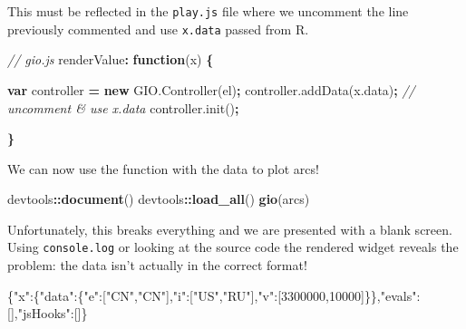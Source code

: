 \documentclass[
]{krantz}
\makeatletter
\newenvironment{Shaded}{\begin{snugshade}}{\end{snugshade}}
\newcommand{\AttributeTok}[1]{\textcolor[rgb]{0.61,0.61,0.61}{#1}}
\newcommand{\CommentTok}[1]{\textcolor[rgb]{0.37,0.37,0.37}{\textit{#1}}}
\newcommand{\DataTypeTok}[1]{\textcolor[rgb]{0.27,0.27,0.27}{#1}}
\newcommand{\DecValTok}[1]{\textcolor[rgb]{0.06,0.06,0.06}{#1}}
\newcommand{\FunctionTok}[1]{\textcolor[rgb]{0,0,0}{#1}}
\newcommand{\KeywordTok}[1]{\textcolor[rgb]{0.27,0.27,0.27}{\textbf{#1}}}
\newcommand{\NormalTok}[1]{#1}
\newcommand{\OperatorTok}[1]{\textcolor[rgb]{0.43,0.43,0.43}{\textbf{#1}}}
\newcommand{\OtherTok}[1]{\textcolor[rgb]{0.37,0.37,0.37}{#1}}
\newcommand{\StringTok}[1]{\textcolor[rgb]{0.5,0.5,0.5}{#1}}
\newcommand{\VariableTok}[1]{\textcolor[rgb]{0,0,0}{#1}}
\newenvironment{kframe}{%
\medskip{}
\setlength{\fboxsep}{.8em}
 \def\at@end@of@kframe{}%
 \ifinner\ifhmode%
  \def\at@end@of@kframe{\end{minipage}}%
  \begin{minipage}{\columnwidth}%
 \fi\fi%
 \def\FrameCommand##1{\hskip\@totalleftmargin \hskip-\fboxsep
 \colorbox{shadecolor}{##1}\hskip-\fboxsep
     \hskip-\linewidth \hskip-\@totalleftmargin \hskip\columnwidth}%
 \MakeFramed {\advance\hsize-\width
   \@totalleftmargin\z@ \linewidth\hsize
   \@setminipage}}%
 {\par\unskip\endMakeFramed%
 \at@end@of@kframe}
\renewenvironment{Shaded}{\begin{kframe}}{\end{kframe}}
\makeatother
\begin{document}
This must be reflected in the \texttt{play.js} file where we uncomment the line previously commented and use \texttt{x.data} passed from R.

\begin{Shaded}
\begin{Highlighting}[]
\CommentTok{// gio.js}
\NormalTok{renderValue}\OperatorTok{:} \KeywordTok{function}\NormalTok{(x) }\OperatorTok{\{}

  \KeywordTok{var}\NormalTok{ controller }\OperatorTok{=} \KeywordTok{new} \VariableTok{GIO}\NormalTok{.}\AttributeTok{Controller}\NormalTok{(el)}\OperatorTok{;}
  \VariableTok{controller}\NormalTok{.}\AttributeTok{addData}\NormalTok{(}\VariableTok{x}\NormalTok{.}\AttributeTok{data}\NormalTok{)}\OperatorTok{;} \CommentTok{// uncomment \& use x.data}
  \VariableTok{controller}\NormalTok{.}\AttributeTok{init}\NormalTok{()}\OperatorTok{;}

\OperatorTok{\}}
\end{Highlighting}
\end{Shaded}

We can now use the function with the data to plot arcs!

\begin{Shaded}
\begin{Highlighting}[]
\NormalTok{devtools}\OperatorTok{::}\KeywordTok{document}\NormalTok{()}
\NormalTok{devtools}\OperatorTok{::}\KeywordTok{load\_all}\NormalTok{()}
\KeywordTok{gio}\NormalTok{(arcs)}
\end{Highlighting}
\end{Shaded}

Unfortunately, this breaks everything and we are presented with a blank screen. Using \texttt{console.log} or looking at the source code the rendered widget reveals the problem: the data isn't actually in the correct format!

\begin{Shaded}
\begin{Highlighting}[]
\FunctionTok{\{}\DataTypeTok{"x"}\FunctionTok{:\{}\DataTypeTok{"data"}\FunctionTok{:\{}\DataTypeTok{"e"}\FunctionTok{:}\OtherTok{[}\StringTok{"CN"}\OtherTok{,}\StringTok{"CN"}\OtherTok{]}\FunctionTok{,}\DataTypeTok{"i"}\FunctionTok{:}\OtherTok{[}\StringTok{"US"}\OtherTok{,}\StringTok{"RU"}\OtherTok{]}\FunctionTok{,}\DataTypeTok{"v"}\FunctionTok{:}\OtherTok{[}\DecValTok{3300000}\OtherTok{,}\DecValTok{10000}\OtherTok{]}\FunctionTok{\}\},}\DataTypeTok{"evals"}\FunctionTok{:}\OtherTok{[]}\FunctionTok{,}\DataTypeTok{"jsHooks"}\FunctionTok{:}\OtherTok{[]}\FunctionTok{\}}
\end{Highlighting}
\end{Shaded}
\end{document}
